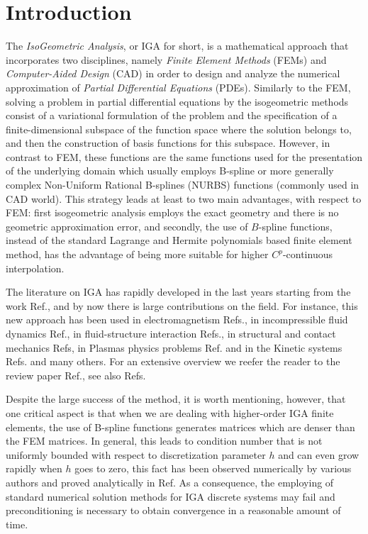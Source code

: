 \section{Introduction}
The {\em IsoGeometric Analysis}, or IGA for short, is a mathematical approach that incorporates two disciplines, namely {\em Finite Element Methods} (FEMs)  and {\em Computer-Aided Design} (CAD) in order to design and analyze the numerical approximation of {\em Partial Differential Equations} (PDEs). Similarly to the FEM, solving a problem in partial differential equations by the isogeometric methods consist of a variational formulation of the problem and the specification of a finite-dimensional subspace of the function space where the solution belongs to, and then the construction of basis functions for this subspace.  However, in contrast to FEM, these functions are the same functions used for the presentation of the underlying domain which usually employs B-spline or more generally complex Non-Uniform Rational B-splines (NURBS) functions (commonly used in CAD world). This strategy leads at least to two main advantages, with respect to FEM: first isogeometric analysis employs the exact geometry and there is no geometric approximation error, and secondly, the use of $B$-spline functions, instead of the standard Lagrange and Hermite polynomials based finite element method, has the advantage of being more suitable for higher $C^p$-continuous interpolation.

The literature on IGA has rapidly developed in the last years
starting from the work Ref., and by now there is large contributions on the field. For instance, this new approach has been used in electromagnetism Refs., in incompressible fluid dynamics Ref., in fluid-structure interaction Refs., in structural and contact mechanics Refs, in Plasmas physics problems Ref. and in the Kinetic systems Refs. and many others. For an extensive overview we reefer the reader to the review paper Ref., see also Refs.

Despite the large success of the method, it is worth mentioning, however, that one critical aspect is that when we are dealing with higher-order IGA finite elements, the use of B-spline functions generates matrices  which are denser than the FEM matrices. In general, this leads to condition number that is not uniformly bounded with respect to discretization parameter $h$ and can even grow rapidly  when $h$ goes to zero,  this fact has been observed numerically by various authors and proved analytically in Ref. As a consequence, the employing of standard numerical solution methods for IGA discrete systems may fail and preconditioning is necessary to obtain convergence in a reasonable amount of time.

